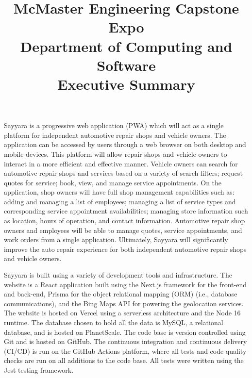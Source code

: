 \documentclass{article}
\title{
    McMaster Engineering Capstone Expo\\
    Department of Computing and Software\\
    Executive Summary\\
    \progname
}
\author{\authname}
\date{}
\begin{document}
\maketitle

Sayyara is a progressive web application (PWA) which will act as a single platform for independent
automotive repair shops and vehicle owners. The application can be accessed by users through a web
browser on both desktop and mobile devices. This platform will allow repair shops and vehicle
owners to interact in a more efficient and effective manner. Vehicle owners can search for
automotive repair shops and services based on a variety of search filters; request quotes for
service; book, view, and manage service appointments. On the application, shop owners will have
full shop management capabilities such as: adding and managing a list of employees; managing a list
of service types and corresponding service appointment availabilities; managing store information
such as location, hours of operation, and contact information. Automotive repair shop owners and
employees will be able to manage quotes, service appointments, and work orders from a single
application. Ultimately, Sayyara will significantly improve the auto repair experience for both
independent automotive repair shops and vehicle owners.

Sayyara is built using a variety of development tools and infrastructure. The website is a React
application built using the Next.js framework for the front-end and back-end, Prisma for the object
relational mapping (ORM) (i.e., database communications), and the Bing Maps API for powering the
geolocation services. The website is hosted on Vercel using a serverless architecture and the Node
16 runtime. The database chosen to hold all the data is MySQL, a relational database, and is hosted
on PlanetScale. The code base is version controlled using Git and is hosted on GitHub. The
continuous integration and continuous delivery (CI/CD) is run on the GitHub Actions platform, where
all tests and code quality checks are run on all additions to the code base. All tests were written
using the Jest testing framework.
\end{document}
